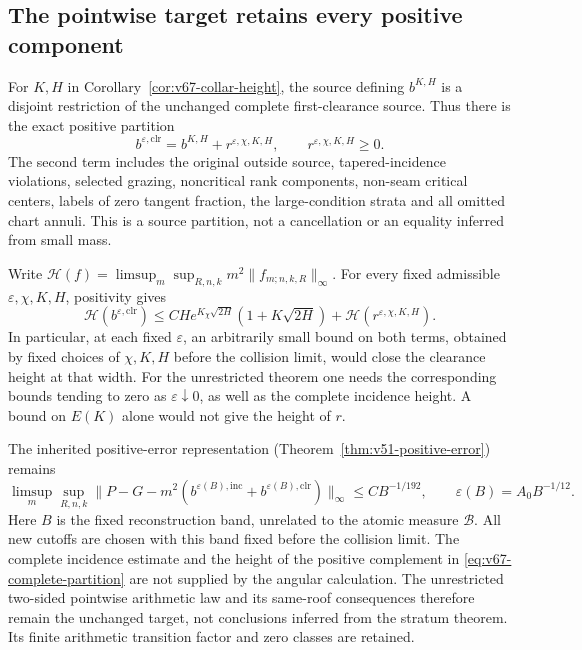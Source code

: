 \subsection{The pointwise target retains every positive component}
For $K,H$ in Corollary~\ref{cor:v67-collar-height}, the source defining
$b^{K,H}$ is a disjoint restriction of the unchanged complete
first-clearance source. Thus there is the exact positive partition
\begin{equation}\label{eq:v67-complete-partition}
 b^{\varepsilon,\mathrm{clr}}
            =b^{K,H}+r^{\varepsilon,\chi,K,H},\qquad
                        r^{\varepsilon,\chi,K,H}\ge0.
\end{equation}
The second term includes the original outside source, tapered-incidence
violations, selected grazing, noncritical rank components, non-seam
critical centers, labels of zero tangent fraction, the large-condition
strata and all omitted chart annuli. This is a source partition, not
a cancellation or an equality inferred from small mass.

Write $\mathcal H(f)=\limsup_m\sup_{R,n,k}m^2\|f_{m;n,k,R}\|_\infty$.
For every fixed admissible $\varepsilon,\chi,K,H$, positivity gives
\begin{equation}\label{eq:v67-complete-height-budget}
 \mathcal H(b^{\varepsilon,\mathrm{clr}})
 \le C H e^{K_\chi\sqrt{2H}}(1+K\sqrt{2H})
                       +\mathcal H(r^{\varepsilon,\chi,K,H}).
\end{equation}
In particular, at each fixed $\varepsilon$, an arbitrarily small bound
on both terms, obtained by fixed choices of $\chi,K,H$ before the
collision limit, would close the clearance height at that width.
For the unrestricted theorem one needs the corresponding bounds tending
to zero as $\varepsilon\downarrow0$, as well as the complete incidence
height. A bound on $E(K)$ alone would not give the height of $r$.

The inherited positive-error representation
(Theorem~\ref{thm:v51-positive-error}) remains
\[
 \limsup_m\sup_{R,n,k}
 \|P-G-m^2(b^{\varepsilon(B),\mathrm{inc}}
                  +b^{\varepsilon(B),\mathrm{clr}})\|_\infty
                                      \le CB^{-1/192},
 \qquad\varepsilon(B)=A_0B^{-1/12}.
\]
Here $B$ is the fixed reconstruction band, unrelated to the atomic
measure $\mathcal B$. All new cutoffs are chosen with this band fixed
before the collision limit. The complete incidence estimate and the
height of the positive complement in \eqref{eq:v67-complete-partition}
are not supplied by the angular calculation. The unrestricted two-sided
pointwise arithmetic law and its same-roof consequences therefore
remain the unchanged target, not conclusions inferred from the stratum
theorem. Its finite arithmetic transition factor and zero classes are
retained.

